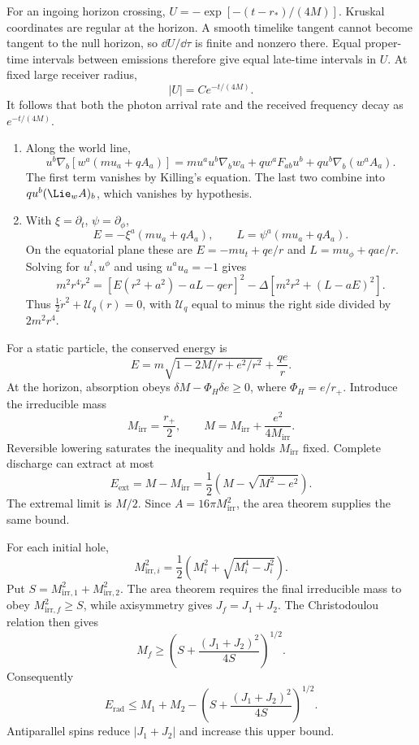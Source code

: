 \ExerciseEditorialNote

\begin{enumerate}[leftmargin=2.8em,itemsep=1.2em]
For an ingoing horizon crossing,
\(U=-\exp[-(t-r_*)/(4M)]\).  Kruskal coordinates are regular at the horizon.
A smooth timelike tangent cannot become tangent to the null horizon, so
\(\dd U/\dd\tau\) is finite and nonzero there.  Equal proper-time intervals
between emissions therefore give equal late-time intervals in \(U\).  At fixed
large receiver radius,
\[
 |U|=C e^{-t/(4M)}.
\]
It follows that both the photon arrival rate and the received frequency decay
as \(e^{-t/(4M)}\).

\begin{enumerate}[label=\alph*),leftmargin=2em]
\item Along the world line,
\[
 u^b\nabla_b[w^a(mu_a+qA_a)]
 =m u^au^b\nabla_bw_a+q w^aF_{ab}u^b
   +q u^b\nabla_b(w^aA_a).
\]
The first term vanishes by Killing's equation.  The last two combine into
\(q u^b(\Lie_wA)_b\), which vanishes by hypothesis.

\item With \(\xi=\partial_t\), \(\psi=\partial_\phi\),
\[
 E=-\xi^a(mu_a+qA_a),\qquad
 L=\psi^a(mu_a+qA_a).
\]
On the equatorial plane these are
\(E=-mu_t+qe/r\) and \(L=mu_\phi+qae/r\).  Solving for
\(u^t,u^\phi\) and using \(u^au_a=-1\) gives
\[
 m^2r^4\dot r^2=
 [E(r^2+a^2)-aL-qer]^2
 -\Delta[m^2r^2+(L-aE)^2].
\]
Thus \(\tfrac12\dot r^2+\mathcal U_q(r)=0\), with \(\mathcal U_q\) equal to minus the
right side divided by \(2m^2r^4\).
\end{enumerate}

For a static particle, the conserved energy is
\[
 E=m\sqrt{1-2M/r+e^2/r^2}+\frac{qe}{r}.
\]
At the horizon, absorption obeys
\(\delta M-\Phi_H\delta e\geq0\), where \(\Phi_H=e/r_+\).
Introduce the irreducible mass
\[
 M_{\mathrm{irr}}=\frac{r_+}{2},\qquad
 M=M_{\mathrm{irr}}+\frac{e^2}{4M_{\mathrm{irr}}}.
\]
Reversible lowering saturates the inequality and holds \(M_{\mathrm{irr}}\)
fixed.  Complete discharge can extract at most
\[
 E_{\mathrm{ext}}=M-M_{\mathrm{irr}}
 =\frac12\left(M-\sqrt{M^2-e^2}\right).
\]
The extremal limit is \(M/2\).  Since \(A=16\pi M_{\mathrm{irr}}^2\), the
area theorem supplies the same bound.

For each initial hole,
\[
 M_{\mathrm{irr},i}^2=\frac12
 \left(M_i^2+\sqrt{M_i^4-J_i^2}\right).
\]
Put \(S=M_{\mathrm{irr},1}^2+M_{\mathrm{irr},2}^2\).  The area theorem
requires the final irreducible mass to obey \(M_{\mathrm{irr},f}^2\geq S\),
while axisymmetry gives \(J_f=J_1+J_2\).  The Christodoulou relation then gives
\[
 M_f\geq\left(S+\frac{(J_1+J_2)^2}{4S}\right)^{1/2}.
\]
Consequently
\[
 E_{\mathrm{rad}}\leq M_1+M_2-
 \left(S+\frac{(J_1+J_2)^2}{4S}\right)^{1/2}.
\]
Antiparallel spins reduce \(|J_1+J_2|\) and increase this upper bound.


\end{enumerate}
